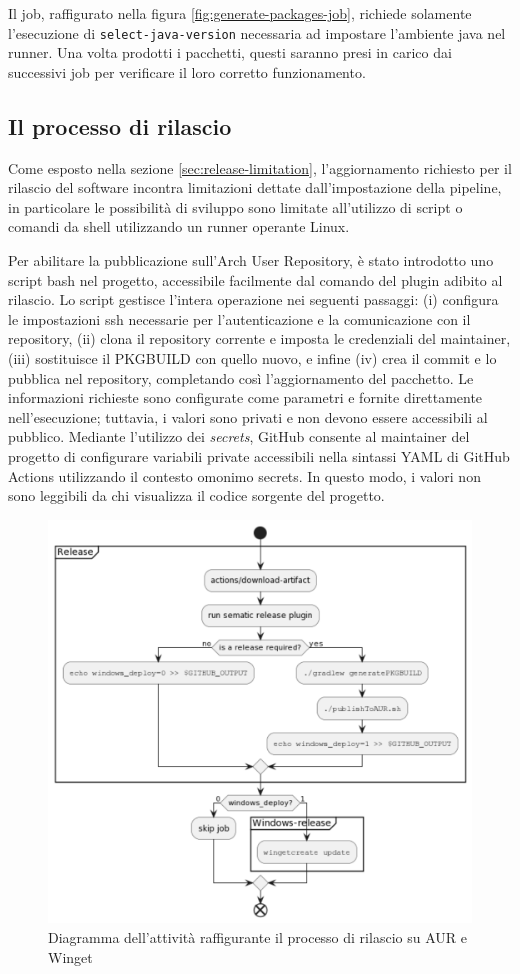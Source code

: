 Il job, raffigurato nella figura \ref{fig:generate-packages-job}, richiede solamente l'esecuzione di \texttt{select\--java\--version} necessaria ad impostare l'ambiente java nel runner. Una volta prodotti i pacchetti, questi saranno presi in carico dai successivi job per verificare il loro corretto funzionamento.

\subsection{Il processo di rilascio}

Come esposto nella sezione \ref{sec:release-limitation}, l'aggiornamento richiesto per il rilascio del software incontra limitazioni dettate dall'impostazione della pipeline, in particolare le possibilità di sviluppo sono limitate all'utilizzo di script o comandi da shell utilizzando un runner operante Linux.

Per abilitare la pubblicazione sull'Arch User Repository, è stato introdotto uno script bash nel progetto, accessibile facilmente dal comando del plugin adibito al rilascio. Lo script gestisce l'intera operazione nei seguenti passaggi: (i) configura le impostazioni ssh necessarie per l'autenticazione e la comunicazione con il repository, (ii) clona il repository corrente e imposta le credenziali del maintainer, (iii) sostituisce il PKGBUILD con quello nuovo, e infine (iv) crea il commit e lo pubblica nel repository, completando così l'aggiornamento del pacchetto. Le informazioni richieste sono configurate come parametri e fornite direttamente nell'esecuzione; tuttavia, i valori sono privati e non devono essere accessibili al pubblico. Mediante l'utilizzo dei \textit{secrets}, GitHub consente al maintainer del progetto di configurare variabili private accessibili nella sintassi YAML di GitHub Actions utilizzando il contesto omonimo secrets. In questo modo, i valori non sono leggibili da chi visualizza il codice sorgente del progetto.

\begin{figure}[htb]
	\centering
	\includegraphics[width=.85\linewidth]{figures/release-flow.pdf}
	\caption{Diagramma dell'attività raffigurante il processo di rilascio su AUR e Winget}
	\label{fig:release-flow}
\end{figure}

